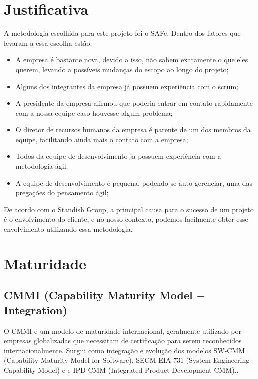 \section{Justificativa}

  A metodologia escolhida para este projeto foi o SAFe. Dentro dos fatores que levaram a essa escolha estão:

  \begin{itemize}
    \item A empresa é bastante nova, devido a isso, não sabem exatamente o que eles querem, levando a possíveis mudanças do escopo ao
          longo do projeto;
    \item Alguns dos integrantes da empresa já possuem experiência com o scrum;
    \item A presidente da empresa afirmou que poderia entrar em contato rapidamente com a nossa equipe caso houvesse algum problema;
    \item O diretor de recursos humanos da empresa é parente de um dos membros da equipe, facilitando ainda mais o contato com a empresa;
    \item Todos da equipe de desenvolvimento ja possuem experiência com a metodologia ágil.
    \item A equipe de desenvolvimento é pequena, podendo se auto gerenciar, uma das pregações do pensamento ágil;
  \end{itemize}

  De acordo com o Standish Group\cite{standishgroup}, a principal causa para o sucesso de um projeto é o envolvimento do cliente, e no
  nosso contexto, podemos facilmente obter esse envolvimento utilizando essa metodologia.

  \section{Maturidade}

  \subsection{CMMI (Capability Maturity Model $-$ Integration)}

    O CMMI é um modelo de maturidade internacional, geralmente utilizado por empresas
    globalizadas que necessitam de certificação para serem reconhecidos internacionalmente.
    Surgiu como integração e evolução dos modelos SW-CMM (Capability Maturity Model for Software),
    SECM EIA 731 (System Engineering Capability Model) e  e IPD-CMM
    (Integrated Product Development CMM).\cite{mct2006}.


